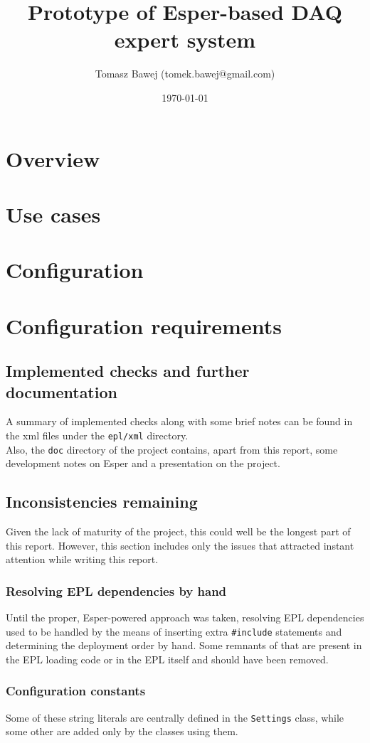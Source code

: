 \documentclass[11pt,oneside,a4paper]{article}
\title{Prototype of Esper-based DAQ expert system}
\date{\today}
\author{Tomasz Bawej (tomek.bawej@gmail.com)}
\begin{document}
\maketitle

\tableofcontents
\clearpage

\section{Overview}



\section{Use cases}\label{sec:usage}



\section{Configuration}\label{sec:config}



\section{Configuration requirements}



\subsection{Implemented checks and further documentation}
A summary of implemented checks along with some brief notes can be found in the xml files under the \texttt{epl/xml} directory. \\
Also, the \texttt{doc} directory of the project contains, apart from this report, some development notes on Esper and a presentation on the project.

%

\subsection{Inconsistencies remaining}

Given the lack of maturity of the project, this could well be the longest part of this report. However, this section includes only the issues that attracted instant attention while writing this report.

\subsubsection{Resolving EPL dependencies by hand}
Until the proper, Esper-powered approach was taken, resolving EPL dependencies used to be handled by the means of inserting extra \texttt{\#include} statements and determining the deployment order by hand.
Some remnants of that are present in the EPL loading code or in the EPL itself and should have been removed.

\subsubsection{Configuration constants}
Some of these string literals are centrally defined in the \texttt{Settings} class, while some other are added only by the classes using them. 
\end{document}
